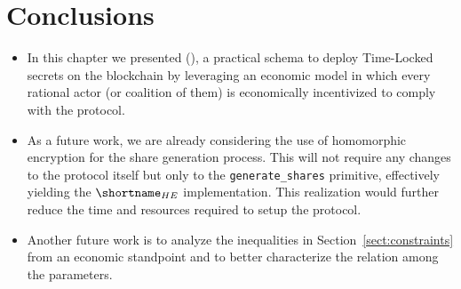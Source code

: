 \section{Conclusions}\label{sect:conclusions}

\begin{itemize}
	\item In this chapter we presented \name (\shortname), a practical schema to deploy Time-Locked secrets on the blockchain by leveraging an economic model in which every rational actor (or coalition of them) is economically incentivized to comply with the protocol.
	\item As a future work, we are already considering the use of homomorphic encryption for the share generation process. This will not require any changes to the protocol itself but only to the \texttt{generate\_shares} primitive, effectively yielding the $\shortname_{HE}$ implementation. This realization would further reduce the time and resources required to setup the \shortname protocol.
	\item Another future work is to analyze the inequalities in Section~\ref{sect:constraints} from an economic standpoint and to better characterize the relation among the parameters.
\end{itemize}